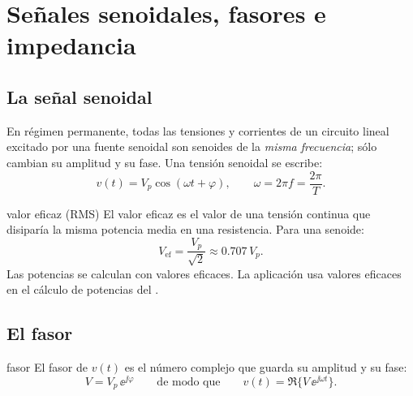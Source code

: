 \chapter{Señales senoidales, fasores e impedancia}

\section{La señal senoidal}

En régimen permanente, todas las tensiones y corrientes de un circuito lineal excitado por una fuente senoidal son senoides
de la \emph{misma frecuencia}; sólo cambian su amplitud y su fase. Una tensión senoidal se escribe:
\begin{equation}
  v(t) = V_p \cos(\omega t + \varphi), \qquad \omega = 2\pi f = \frac{2\pi}{T}.
\end{equation}
\begin{donde}
\end{donde}

\begin{definicion}{valor eficaz (RMS)}
El valor eficaz es el valor de una tensión continua que disiparía la misma potencia media en una resistencia.
Para una senoide:
\begin{equation}
  V_{\text{ef}} = \frac{V_p}{\sqrt{2}} \approx 0.707\,V_p .
\end{equation}
Las potencias se calculan con valores eficaces. La aplicación usa valores eficaces en el cálculo de potencias del .
\end{definicion}

\section{El fasor}

\begin{definicion}{fasor}
El fasor de $v(t)$ es el número complejo que guarda su amplitud y su fase:
\begin{equation}
  V = V_p\,\ee^{\jj\varphi} \qquad\text{de modo que}\qquad v(t) = \Re\{V\,\ee^{\jj\omega t}\} .
\end{equation}
\begin{donde}
\end{donde}
\end{definicion}

